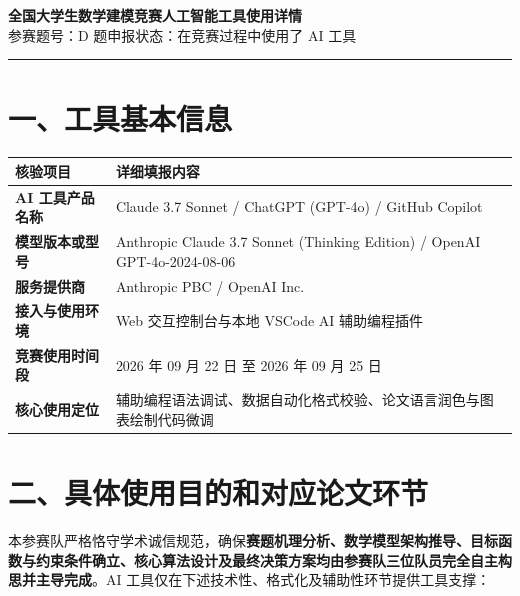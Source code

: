 \documentclass[fontset=windows, 12pt, a4paper]{ctexart}
\begin{document}
\begin{center}
  {\heiti\bfseries 全国大学生数学建模竞赛人工智能工具使用详情}\\[0.6em]
  {\heiti 参赛题号：D 题\qquad 申报状态：在竞赛过程中使用了 AI 工具}
\end{center}
\vspace{1em}

\noindent\rule{\textwidth}{1pt}
\vspace{0.8em}

\section*{一、工具基本信息}

\begin{table}[htbp]
  \centering
  \fontsize{10.5pt}{14pt}\selectfont
  \begin{tabularx}{\textwidth}{@{}p{3.5cm}X@{}}
    \toprule
    \textbf{核验项目} & \textbf{详细填报内容} \\
    \midrule
    \textbf{AI 工具产品名称} & Claude 3.7 Sonnet / ChatGPT (GPT-4o) / GitHub Copilot \\
    \textbf{模型版本或型号} & Anthropic Claude 3.7 Sonnet (Thinking Edition) / OpenAI GPT-4o-2024-08-06 \\
    \textbf{服务提供商} & Anthropic PBC / OpenAI Inc. \\
    \textbf{接入与使用环境} & Web 交互控制台与本地 VSCode AI 辅助编程插件 \\
    \textbf{竞赛使用时间段} & 2026 年 09 月 22 日 至 2026 年 09 月 25 日 \\
    \textbf{核心使用定位} & 辅助编程语法调试、数据自动化格式校验、论文语言润色与图表绘制代码微调 \\
    \bottomrule
  \end{tabularx}
\end{table}

\section*{二、具体使用目的和对应论文环节}

本参赛队严格恪守学术诚信规范，确保\textbf{赛题机理分析、数学模型架构推导、目标函数与约束条件确立、核心算法设计及最终决策方案均由参赛队三位队员完全自主构思并主导完成}。AI 工具仅在下述技术性、格式化及辅助性环节提供工具支撑：
\end{document}
